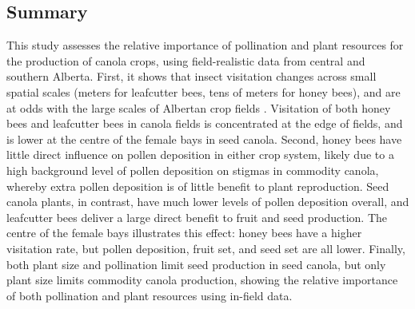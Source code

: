 \documentclass[12pt]{article} %
\begin{document}
\subsection{Summary} %
This study assesses the relative importance of pollination and plant resources for the production of canola crops, using field-realistic data from central and southern Alberta.
First, it shows that insect visitation changes across small spatial scales (meters for leafcutter bees, tens of meters for honey bees), and are at odds with the large scales of Albertan crop fields \citep{fritz2015}.
Visitation of both honey bees and leafcutter bees in canola fields is concentrated at the edge of fields, and is lower at the centre of the female bays in seed canola.	
Second, honey bees have little direct influence on pollen deposition in either crop system, likely due to a high background level of pollen deposition on stigmas in commodity canola, whereby extra pollen deposition is of little benefit to plant reproduction.
Seed canola plants, in contrast, have much lower levels of pollen deposition overall, and leafcutter bees deliver a large direct benefit to fruit and seed production. 
The centre of the female bays illustrates this effect: honey bees have a higher visitation rate, but pollen deposition, fruit set, and seed set are all lower.
Finally, both plant size and pollination limit seed production in seed canola, but only plant size limits commodity canola production, showing the relative importance of both pollination and plant resources using in-field data.
\end{document}
